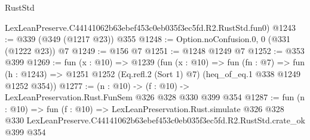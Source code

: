 \begin{lexlean}{RustStd}
\begin{coremodule}
    LexLeanPreserve.C44141062b63ebef453c0eb035f3ec5fd.R2.RustStd.fun0)
@1243 := @339 (@349 (@1217 @23)) @355
@1248 := Option.noConfusion.{0, 0} (@331 (@1222 @23)) @7
@1249 := @156 @7
@1251 := @1248 @1249 @7
@1252 := @353 @399
@1269 := fun (x : @10) =>
  @1239
    (fun (x : @10) =>
    fun (fn : @7) =>
    fun (h : @1243) => @1251 @1252 (Eq.refl.{2} (Sort 1) @7) (heq_of_eq.{1} @338 @1249 @1252 @354))
@1277 := (n : @10) -> (f : @10) -> LexLeanPreservation.Rust.FunSem @326 @328 @330 @399 @354
@1287 := fun (n : @10) =>
  fun (f : @10) =>
  LexLeanPreservation.Rust.simulate
    @326
    @328
    @330
    LexLeanPreserve.C44141062b63ebef453c0eb035f3ec5fd.R2.RustStd.crate_ok
    @399
    @354
\end{coremodule}
\end{lexlean}
